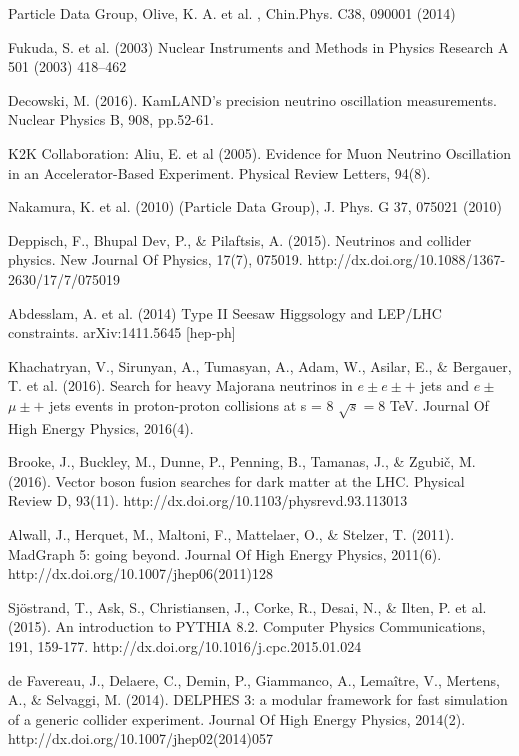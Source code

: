 \documentclass[11pt, oneside]{book}
\begin{document}
\begin{thebibliography}{10}

Particle Data Group, Olive, K. A. et al. , Chin.Phys. C38, 090001 (2014)


 Fukuda, S. et al. (2003) Nuclear Instruments and Methods in Physics Research A 501 (2003) 418–462

 Decowski, M. (2016). KamLAND's precision neutrino oscillation measurements. Nuclear Physics B, 908, pp.52-61.

 K2K Collaboration: Aliu, E. et al (2005). Evidence for Muon Neutrino Oscillation in an Accelerator-Based Experiment. Physical Review Letters, 94(8).

Nakamura, K. et al. (2010) (Particle Data Group), J. Phys. G 37, 075021 (2010) 

 Deppisch, F., Bhupal Dev, P., \& Pilaftsis, A. (2015). Neutrinos and collider physics. New Journal Of Physics, 17(7), 075019. http://dx.doi.org/10.1088/1367-2630/17/7/075019

 Abdesslam, A. et al. (2014) Type II Seesaw Higgsology and LEP/LHC constraints. arXiv:1411.5645 [hep-ph]

 Khachatryan, V., Sirunyan, A., Tumasyan, A., Adam, W., Asilar, E., \& Bergauer, T. et al. (2016). Search for heavy Majorana neutrinos in $e\pm e\pm +$ jets and $e\pm$ $\mu \pm +$ jets events in proton-proton collisions at s = 8 $\sqrt{s}=8$ TeV. Journal Of High Energy Physics, 2016(4).

 Brooke, J., Buckley, M., Dunne, P., Penning, B., Tamanas, J., \& Zgubič, M. (2016). Vector boson fusion searches for dark matter at the LHC. Physical Review D, 93(11). http://dx.doi.org/10.1103/physrevd.93.113013

 Alwall, J., Herquet, M., Maltoni, F., Mattelaer, O., \& Stelzer, T. (2011). MadGraph 5: going beyond. Journal Of High Energy Physics, 2011(6). http://dx.doi.org/10.1007/jhep06(2011)128

Sjöstrand, T., Ask, S., Christiansen, J., Corke, R., Desai, N., \& Ilten, P. et al. (2015). An introduction to PYTHIA 8.2. Computer Physics Communications, 191, 159-177. http://dx.doi.org/10.1016/j.cpc.2015.01.024

 de Favereau, J., Delaere, C., Demin, P., Giammanco, A., Lemaître, V., Mertens, A., \& Selvaggi, M. (2014). DELPHES 3: a modular framework for fast simulation of a generic collider experiment. Journal Of High Energy Physics, 2014(2). http://dx.doi.org/10.1007/jhep02(2014)057


\end{thebibliography}
\end{document}
